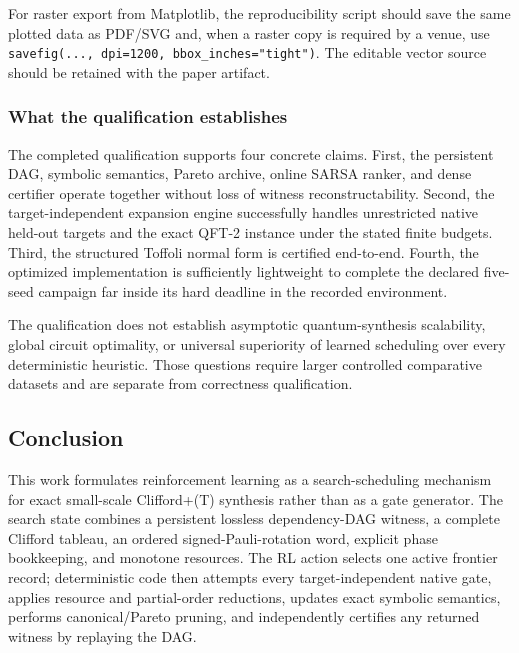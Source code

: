 \documentclass[
]{article}
\begin{document}
For raster export from Matplotlib, the reproducibility script should
save the same plotted data as PDF/SVG and, when a raster copy is
required by a venue, use
\texttt{savefig(...,\ dpi=1200,\ bbox\_inches="tight")}. The editable
vector source should be retained with the paper artifact.

\hypertarget{what-the-qualification-establishes}{%
\subsubsection{What the qualification
establishes}\label{what-the-qualification-establishes}}

The completed qualification supports four concrete claims. First, the
persistent DAG, symbolic semantics, Pareto archive, online SARSA ranker,
and dense certifier operate together without loss of witness
reconstructability. Second, the target-independent expansion engine
successfully handles unrestricted native held-out targets and the exact
QFT-2 instance under the stated finite budgets. Third, the structured
Toffoli normal form is certified end-to-end. Fourth, the optimized
implementation is sufficiently lightweight to complete the declared
five-seed campaign far inside its hard deadline in the recorded
environment.

The qualification does not establish asymptotic quantum-synthesis
scalability, global circuit optimality, or universal superiority of
learned scheduling over every deterministic heuristic. Those questions
require larger controlled comparative datasets and are separate from
correctness qualification.

\hypertarget{conclusion}{%
\subsection{Conclusion}\label{conclusion}}

This work formulates reinforcement learning as a search-scheduling
mechanism for exact small-scale Clifford+(T) synthesis rather than as a
gate generator. The search state combines a persistent lossless
dependency-DAG witness, a complete Clifford tableau, an ordered
signed-Pauli-rotation word, explicit phase bookkeeping, and monotone
resources. The RL action selects one active frontier record;
deterministic code then attempts every target-independent native gate,
applies resource and partial-order reductions, updates exact symbolic
semantics, performs canonical/Pareto pruning, and independently
certifies any returned witness by replaying the DAG.
\end{document}
